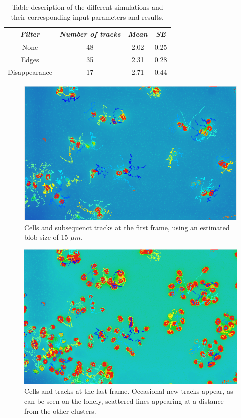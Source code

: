 \documentclass[10pt]{article}
\theoremstyle{plain}
\begin{document}
\begin{multicols*}{2}
\begin{multicols}{2}
\begin{table}
  \centering
  \caption{Table description of the different simulations and their corresponding input parameters and results.}
  \label{tab:tracks}
  \begin{tabular}{cccc}\toprule
  \emph{Filter} & \emph{Number of tracks} & \emph{Mean} & \emph{SE} \\\midrule
    None          & 48 & 2.02 & 0.25 \\
    Edges         & 35 & 2.31 & 0.28 \\
    Disappearance & 17 & 2.71 & 0.44 \\\bottomrule
  \hline
  \end{tabular}
\end{table}

\begin{figure}[H]
  \centering
  \includegraphics[width=.5\textwidth]{../figures/start_cells.png}
  \caption{Cells and subsequenct tracks at the first frame, using an estimated blob size of 15 $\mu m$.}
  \label{fig:contrasts}
\end{figure}
\begin{figure}[H]
  \centering
  \includegraphics[width=.5\textwidth]{../figures/end_cells.png}
  \caption{Cells and tracks at the last frame. Occasional new tracks appear, as can be seen on the lonely, scattered lines appearing at a distance from the other clusters. }
  \label{fig:contrasts}
\end{figure}


\end{multicols}
\end{multicols*}
\end{document}
